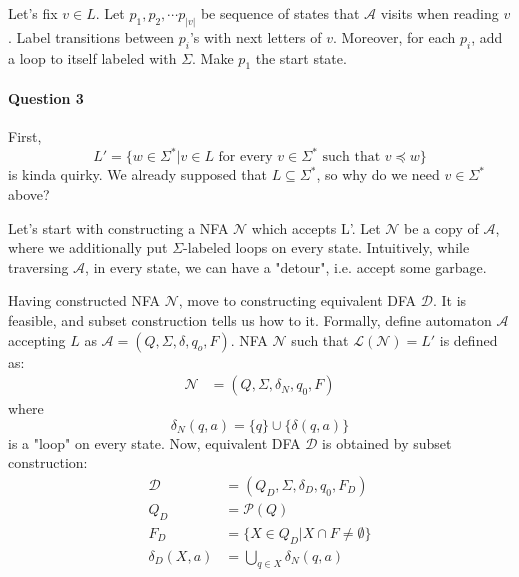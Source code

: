 
Let's fix $v\in L$.
Let $p_1, p_2, \cdots p_{|v|}$ be sequence of states that $\mathcal{A}$ visits when reading $v$.
Label transitions between $p_i$'s with next letters of $v$.
Moreover, for each $p_i$, add a loop to itself labeled with $\Sigma$.
Make $p_1$ the start state.

\paragraph{Question 3}
First,
\begin{equation*}
    L' = \{ w \in \Sigma^* | v\in L \text{ for every } v\in \Sigma^* \text{ such that  } v\preceq w\}
\end{equation*}
is kinda quirky. 
We already supposed that $L \subseteq \Sigma^*$, so why do we need $v\in \Sigma^*$ above?

Let's start with constructing a NFA $\mathcal{N}$ which accepts L'.
Let $\mathcal{N}$ be a copy of $\mathcal{A}$, where we additionally put $\Sigma$-labeled loops on every state.
Intuitively, while traversing $\mathcal{A}$, in every state, we can have a "detour", i.e. accept some garbage.

Having constructed NFA $\mathcal{N}$, move to constructing equivalent DFA $\mathcal{D}$.
It is feasible, and subset construction tells us how to it.
Formally, define automaton $\mathcal{A}$ accepting $L$ as $\mathcal{A} = (Q, \Sigma, \delta, q_o, F)$.
NFA $\mathcal{N}$ such that $\mathcal{L}(\mathcal{N}) = L'$ is defined as:
\begin{align*}
    \mathcal{N} &= (Q, \Sigma, \delta_N, q_0, F)
\end{align*}
where
\begin{equation*}
    \delta_N(q, a) = \{q\} \cup \{\delta(q,a)\}
\end{equation*}
is a "loop" on every state.
Now, equivalent DFA $\mathcal{D}$ is obtained by subset construction:
\begin{align*}
    \mathcal{D} &= (Q_D, \Sigma, \delta_D, {q_0}, F_D) \\
    Q_D &= \mathcal{P}(Q) \\
    F_D &= \{ X\in Q_D | X\cap F \neq \emptyset\} \\
    \delta_D(X,a) &= \bigcup_{q \in X} \delta_N(q,a)
\end{align*}


